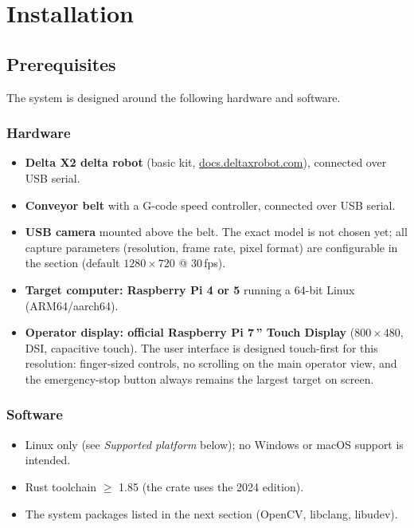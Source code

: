 \chapter{Installation}

\section{Prerequisites}
%
The system is designed around the following hardware and software.

\subsection{Hardware}
\begin{itemize}
  \item \textbf{Delta X2 delta robot} (basic kit,
    \href{https://docs.deltaxrobot.com/products/deltax2/deltax2_basic_kit/}{docs.deltaxrobot.com}),
    connected over USB serial.
  \item \textbf{Conveyor belt} with a G-code speed controller, connected over
    USB serial.
  \item \textbf{USB camera} mounted above the belt. The exact model is not
    chosen yet; all capture parameters (resolution, frame rate, pixel
    format) are configurable in the \cfg{[camera]} section (default
    $1280 \times 720$ @ 30\,fps).
  \item \textbf{Target computer: Raspberry Pi 4 or 5} running a 64-bit Linux
    (ARM64/aarch64).
  \item \textbf{Operator display: official Raspberry Pi 7\,'' Touch Display}
    ($800 \times 480$, DSI, capacitive touch). The user interface is designed
    touch-first for this resolution: finger-sized controls, no scrolling on
    the main operator view, and the emergency-stop button always remains the
    largest target on screen.
\end{itemize}

\subsection{Software}
\begin{itemize}
  \item Linux only (see \emph{Supported platform} below); no Windows or macOS
    support is intended.
  \item Rust toolchain $\geq$ 1.85 (the crate uses the 2024 edition).
  \item The system packages listed in the next section (OpenCV, libclang,
    libudev).
\end{itemize}

